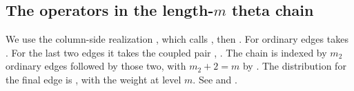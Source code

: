 \subsection{The operators in the length-\(m\) theta chain}\label{geo:chain}

We use the column-side realization , which calls , then . For ordinary edges  takes . For the last two edges it takes the coupled pair , . The chain is indexed by \(m_2\) ordinary edges followed by those two, with \(m_2+2=m\) by .  The distribution for the final edge is , with the weight at level \(m\). See  and .

